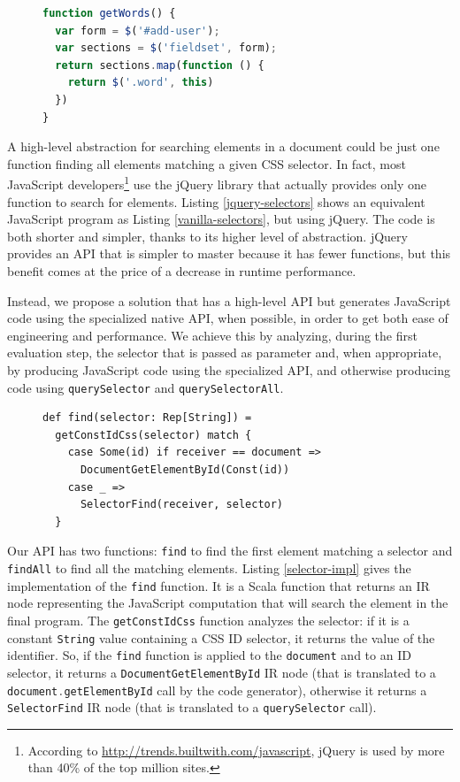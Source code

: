 \documentclass{llncs}
\newcommand{\code}[1]{\lstinline[language=Scala,columns=fixed,basicstyle=\footnotesize]|#1|}
\begin{document}
\begin{figure}[htb]
\begin{lstlisting}[language=JavaScript,label=jquery-selectors,caption=Searching elements using jQuery]
function getWords() {
  var form = $('#add-user');
  var sections = $('fieldset', form);
  return sections.map(function () {
    return $('.word', this)
  })
}
\end{lstlisting}
\end{figure}

A high-level abstraction for searching elements in a document could be just one function
finding all elements matching a given CSS selector. In fact, most JavaScript
developers\footnote{According to
\href{http://trends.builtwith.com/javascript}{http://trends.builtwith.com/javascript}, jQuery is
used by more than 40\% of the top million sites.} use the jQuery library
that actually provides only one function to search for elements. Listing \ref{jquery-selectors}
shows an equivalent JavaScript program as Listing \ref{vanilla-selectors}, but using jQuery. The
code is both shorter and simpler, thanks to its higher level of abstraction. jQuery provides an API
that is simpler to master because it has fewer functions, but this benefit comes at the price of a
decrease in runtime performance.

Instead, we propose a solution that has a high-level API but generates JavaScript code using the
specialized native API, when possible, in order to get both ease of engineering and performance.
We achieve this by analyzing, during the first evaluation step, the selector that is
passed as parameter and, when appropriate, by producing JavaScript code using the specialized API,
and otherwise producing code using \code{querySelector} and \code{querySelectorAll}.

\begin{figure}[htb]
\begin{lstlisting}[label=selector-impl,caption=Selectors optimization]
def find(selector: Rep[String]) =
  getConstIdCss(selector) match {
    case Some(id) if receiver == document =>
      DocumentGetElementById(Const(id))
    case _ =>
      SelectorFind(receiver, selector)
  }
\end{lstlisting}
\end{figure}

Our API has two functions: \code{find} to find the first element matching a selector and
\code{findAll} to find all the matching elements. Listing \ref{selector-impl} gives the
implementation of the \code{find} function. It is a Scala function that returns an IR node
representing the JavaScript computation that will search the element in the final program. The
\code{getConstIdCss} function analyzes the selector: if it is a constant \code{String} value
containing a CSS ID selector, it returns the value of the identifier. So, if the \code{find}
function is applied to the \code{document} and to an ID selector, it returns a
\code{DocumentGetElementById} IR node (that is translated to a \code{document.getElementById} call
by the code generator), otherwise it returns a \code{SelectorFind} IR node (that is translated to a
\code{querySelector} call).
\end{document}

